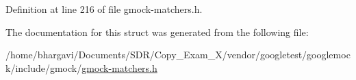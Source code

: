 Definition at line 216 of file gmock-\/matchers.\+h.



The documentation for this struct was generated from the following file\+:\begin{DoxyCompactItemize}
\item 
/home/bhargavi/\+Documents/\+S\+D\+R/\+Copy\+\_\+\+Exam\+\_\+X/vendor/googletest/googlemock/include/gmock/\hyperlink{gmock-matchers_8h}{gmock-\/matchers.\+h}\end{DoxyCompactItemize}
